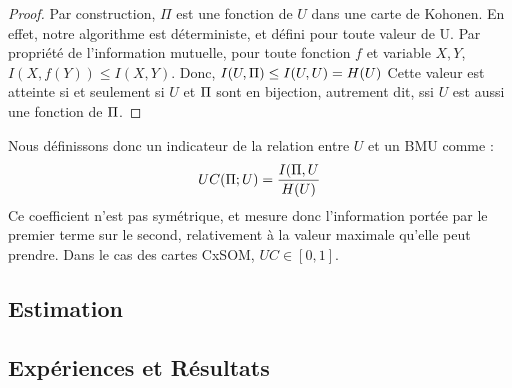 \begin{proof}
Par construction, $\Pi$ est une fonction de $U$ dans une carte de Kohonen. En effet, notre algorithme est déterministe, et défini pour toute valeur de U. 
Par propriété de l'information mutuelle, pour toute fonction $f$ et variable $X,Y$, $I(X,f(Y)) \leq I(X,Y) $.
Donc, $I(U,\Pi) \leq I(U,U) = H(U)$
Cette valeur est atteinte si et seulement si $U$ et $\Pi$ sont en bijection, autrement dit, ssi $U$ est aussi une fonction de $\Pi$.
\end{proof}

Nous définissons donc un indicateur de la relation entre $U$ et un BMU comme :
\begin{equation}
UC(\Pi;U) = \frac{I(\Pi,U}{H(U)}
\end{equation}
Ce coefficient n'est pas symétrique, et mesure donc l'information portée par le premier terme sur le second, relativement à la valeur maximale qu'elle peut prendre. Dans le cas des cartes CxSOM, $UC \in [0,1]$. 

\subsection{Estimation}



\subsection{Expériences et Résultats}




